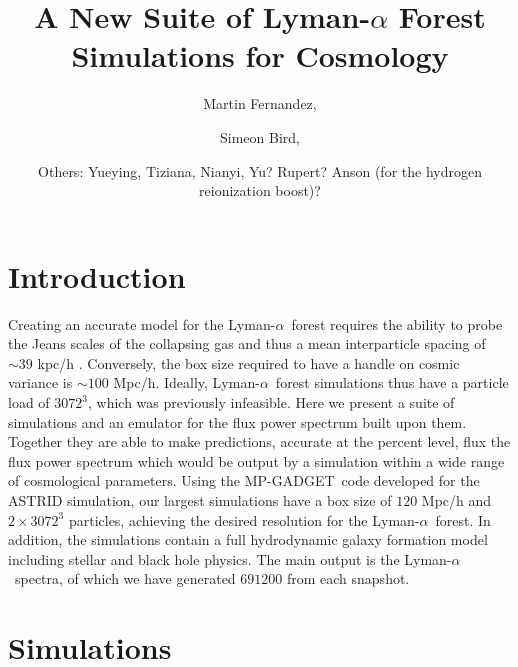 \documentclass[a4paper,11pt]{article}
\title{A New Suite of Lyman-$\alpha$ Forest Simulations for Cosmology}
\author[a,1]{Martin Fernandez,\note{Corresponding author}}
\author[a]{Simeon Bird,}
\affiliation[a]{Department of Physics \& Astronomy, University of California  Riverside,\\900 University Avenue, Riverside, CA 92521, USA}
\author[b]{Others: Yueying, Tiziana, Nianyi, Yu? Rupert? Anson (for the hydrogen reionization boost)?}
\newcommand{\Lya}{Lyman-$\alpha$}
\newcommand{\mpgadget}{{\small MP-GADGET}}
\begin{document}
\maketitle

\section{Introduction}



Creating an accurate model for the \Lya~forest requires the ability to probe the Jeans scales of the collapsing gas and thus a mean interparticle spacing of $\sim 39$ kpc/h \cite{Borde:2014}. Conversely, the box size required to have a handle on cosmic variance is $\sim 100$ Mpc/h. Ideally, \Lya~forest simulations thus have a particle load of  $3072^3$, which was previously infeasible. Here we present a suite of simulations and an emulator for the flux power spectrum built upon them. Together they are able to make predictions, accurate at the percent level, flux the flux power spectrum which would be output by a simulation within a wide range of cosmological parameters. Using the \mpgadget~code developed for the ASTRID simulation, our largest simulations have a box size of $120$ Mpc/h and $2\times 3072^3$ particles, achieving the desired resolution for the \Lya~forest. In addition, the simulations contain a full hydrodynamic galaxy formation model including stellar and black hole physics. The main output is the \Lya~spectra, of which we have generated $691200$ from each snapshot.

\cite{Puchwein:2022}



\section{Simulations}
\end{document}
